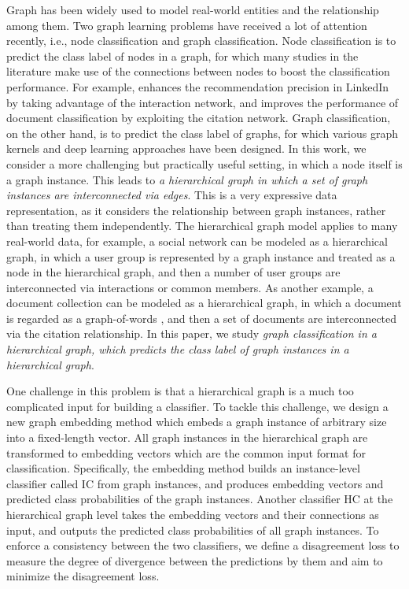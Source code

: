 \documentclass[sigconf]{acmart}
\begin{document}
Graph has been widely used to model real-world entities and the relationship among them.  Two graph learning problems have received a lot of attention recently, i.e., node classification and graph classification.  Node classification is to predict the class label of nodes in a graph, for which many studies in the literature make use of the connections between nodes to boost the classification performance.  For example, \cite{ramanath2018towards} enhances the recommendation precision in LinkedIn by taking advantage of the interaction network, and \cite{sen2008collective} improves the performance of document classification by exploiting the citation network.  Graph classification, on the other hand, is to predict the class label of graphs, for which various graph kernels \cite{borgwardt2005shortest,gartner2003graph,shervashidze2009efficient,shervashidze2011weisfeiler} and deep learning approaches \cite{Niepert2016LearningCN,DBLP:journals/corr/NarayananCVCLJ17} have been designed.  In this work, we consider a more challenging but practically useful setting, in which a node itself is a graph instance.  This leads to \emph{a hierarchical graph in which a set of graph instances are interconnected via edges}.  This is a very expressive data representation, as it considers the relationship between graph instances, rather than treating them independently.  The hierarchical graph model applies to many real-world data, for example, a social network can be modeled as a hierarchical graph, in which a user group is represented by a graph instance and treated as a node in the hierarchical graph, and then a number of user groups are interconnected via interactions or common members.  As another example, a document collection can be modeled as a hierarchical graph, in which a document is regarded as a graph-of-words \cite{rousseau2015text}, and then a set of documents are interconnected via the citation relationship.  In this paper, we study \emph{graph classification in a hierarchical graph, which predicts the class label of graph instances in a hierarchical graph}.

One challenge in this problem is that a hierarchical graph is a much too complicated input for building a classifier.  To tackle this challenge, we design a new graph embedding method which embeds a graph instance of arbitrary size into a fixed-length vector.  All graph instances in the hierarchical graph are transformed to embedding vectors which are the common input format for classification.  Specifically, the embedding method builds an instance-level classifier called IC from graph instances, and produces embedding vectors and predicted class probabilities of the graph instances.  Another classifier HC at the hierarchical graph level takes the embedding vectors and their connections as input, and outputs the predicted class probabilities of all graph instances.  To enforce a consistency between the two classifiers, we define a disagreement loss to measure the degree of divergence between the predictions by them and aim to minimize the disagreement loss.
\end{document}
